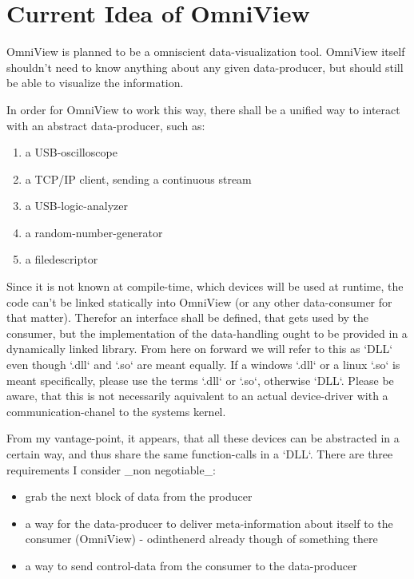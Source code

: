 \documentclass[]{scrartcl}
\begin{document}
\chapter{Current Idea of OmniView}
OmniView is planned to be a omniscient data-visualization tool. OmniView itself shouldn't need to know anything about any given data-producer, but should still be able to visualize the information.

In order for OmniView to work this way, there shall be a unified way to interact with an abstract data-producer, such as:
\begin{enumerate}
    \item a USB-oscilloscope
    \item a TCP/IP client, sending a continuous stream
    \item a USB-logic-analyzer
    \item a random-number-generator
    \item a filedescriptor
\end{enumerate}

Since it is not known at compile-time, which devices will be used at runtime, the code can't be linked statically into OmniView (or any other data-consumer for that matter). Therefor an interface shall be defined, that gets used by the consumer, but the implementation of the data-handling ought to be provided in a dynamically linked library. From here on forward we will refer to this as `DLL` even though `.dll` and `.so` are meant equally. If a windows `.dll` or a linux `.so` is meant specifically, please use the terms `.dll` or `.so`, otherwise `DLL`. Please be aware, that this is not necessarily aquivalent to an actual device-driver with a communication-chanel to the systems kernel.

From my vantage-point, it appears, that all these devices can be abstracted in a certain way, and thus share the same function-calls in a `DLL`.
There are three requirements I consider _non negotiable_:
\begin{itemize}
    \item grab the next block of data from the producer
    \item a way for the data-producer to deliver meta-information about itself to the consumer (OmniView) - odinthenerd already though of something there
    \item a way to send control-data from the consumer to the data-producer
\end{itemize}
\end{document}
